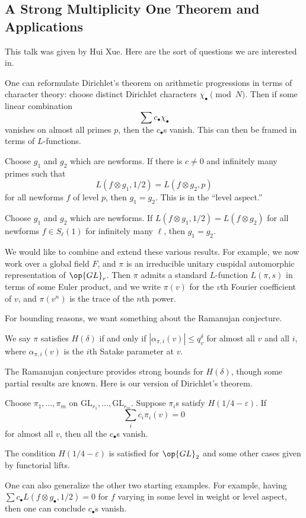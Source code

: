 \documentclass{article}
\begin{document}
\subsection{A Strong Multiplicity One Theorem and Applications}
This talk was given by Hui Xue.  Here are the sort of questions we are interested in.
\begin{example}
	One can reformulate Dirichlet's theorem on arithmetic progressions in terms of character theory: choose distinct Dirichlet characters $\chi_\bullet\pmod N$. Then if some linear combination
	\[\sum c_\bullet\chi_\bullet\]
	vanishes on almost all primes $p$, then the $c_\bullet$s vanish. This can then be framed in terms of $L$-functions.
\end{example}
\begin{example}[Luo]
	Choose $g_1$ and $g_2$ which are newforms. If there is $c\ne0$ and infinitely many primes such that
	\[L(f\otimes g_1,1/2)=L(f\otimes g_2,p)\]
	for all newforms $f$ of level $p$, then $g_1=g_2$. This is in the ``level aspect.''
\end{example}
\begin{example}
	Choose $g_1$ and $g_2$ which are newforms. If $L(f\otimes g_1,1/2)=L(f\otimes g_2)$ for all newforms $f\in S_\ell(1)$ for infinitely many $\ell$, then $g_1=g_2$.
\end{example}
We would like to combine and extend these various results. For example, we now work over a global field $F$, and $\pi$ is an irreducible unitary cuspidal automorphic representation of $\op{GL}_r$. Then $\pi$ admits a standard $L$-function $L(\pi,s)$ in terms of some Euler product, and we write $\pi(v)$ for the $v$th Fourier coefficient of $v$, and $\pi(v^n)$ is the trace of the $n$th power.

For bounding reasons, we want something about the Ramanujan conjecture.
\begin{definition}
	We say $\pi$ satisfies $H(\delta)$ if and only if $\left|\alpha_{\pi,i}(v)\right|\le q_v^\delta$ for almost all $v$ and all $i$, where $\alpha_{\pi,i}(v)$ is the $i$th Satake parameter at $v$.
\end{definition}
The Ramanujan conjecture provides strong bounds for $H(\delta)$, though some partial results are known. Here is our version of Dirichlet's theorem.
\begin{theorem}
	Choose $\pi_1,\ldots,\pi_m$ on $\mathrm{GL}_{r_1},\ldots,\mathrm{GL}_{r_m}$. Suppose $\pi_i$s satisfy $H(1/4-\varepsilon)$. If
	\[\sum_ic_i\pi_i(v)=0\]
	for almost all $v$, then all the $c_\bullet$s vanish.
\end{theorem}
\begin{remark}
	The condition $H(1/4-\varepsilon)$ is satisfied for $\op{GL}_2$ and some other cases given by functorial lifts.
\end{remark}
\begin{remark}
	One can also generalize the other two starting examples. For example, having $\sum c_\bullet L(f\otimes g_\bullet,1/2)=0$ for $f$ varying in some level in weight or level aspect, then one can conclude $c_\bullet$s vanish.
\end{remark}
\end{document}
